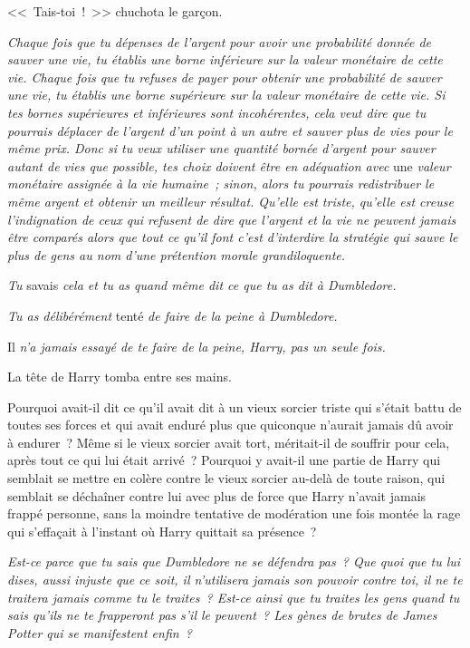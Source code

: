 <<~Tais-toi~!~>> chuchota le garçon.

\emph{Chaque fois que tu dépenses de l'argent pour avoir une probabilité donnée de sauver une vie, tu établis une borne inférieure sur la valeur monétaire de cette vie. Chaque fois que tu refuses de payer pour obtenir une probabilité de sauver une vie, tu établis une borne supérieure sur la valeur monétaire de cette vie. Si tes bornes supérieures et inférieures sont incohérentes, cela veut dire que tu pourrais déplacer de l'argent d'un point à un autre et sauver plus de vies pour le même prix. Donc si tu veux utiliser une quantité bornée d'argent pour sauver autant de vies que possible, tes choix doivent être en adéquation avec} une \emph{valeur monétaire assignée à la vie humaine~; sinon, alors tu pourrais redistribuer le même argent et obtenir un meilleur résultat. Qu'elle est triste, qu'elle est creuse l'indignation de ceux qui refusent de dire que l'argent et la vie ne peuvent jamais être comparés alors que tout ce qu'il font c'est d'interdire la stratégie qui sauve le plus de gens au nom d'une prétention morale grandiloquente.}

\emph{Tu} savais \emph{cela et tu as quand même dit ce que tu as dit à Dumbledore.}

\emph{Tu as délibérément} tenté \emph{de faire de la peine à Dumbledore.}

Il \emph{n'a jamais essayé de te faire de la peine, Harry, pas un seule fois.}

La tête de Harry tomba entre ses mains.

Pourquoi avait-il dit ce qu'il avait dit à un vieux sorcier triste qui s'était battu de toutes ses forces et qui avait enduré plus que quiconque n'aurait jamais dû avoir à endurer~? Même si le vieux sorcier avait tort, méritait-il de souffrir pour cela, après tout ce qui lui était arrivé~? Pourquoi y avait-il une partie de Harry qui semblait se mettre en colère contre le vieux sorcier au-delà de toute raison, qui semblait se déchaîner contre lui avec plus de force que Harry n'avait jamais frappé personne, sans la moindre tentative de modération une fois montée la rage qui s'effaçait à l'instant où Harry quittait sa présence~?

\emph{Est-ce parce que tu sais que Dumbledore ne se défendra pas~? Que quoi que tu lui dises, aussi injuste que ce soit, il n'utilisera jamais son pouvoir contre toi, il ne te traitera jamais comme tu le traites~? Est-ce ainsi que tu traites les gens quand tu sais qu'ils ne te frapperont pas s'il le peuvent~? Les gènes de brutes de James Potter qui se manifestent enfin~?}

